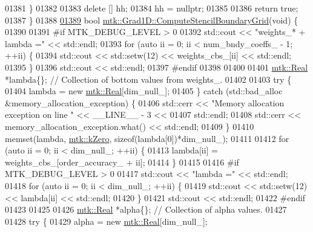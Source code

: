 \begin{DoxyCode}
{{01381   \}
01382 
01383   \textcolor{keyword}{delete} [] hh;
01384   hh = \textcolor{keyword}{nullptr};
01385 
01386   \textcolor{keywordflow}{return} \textcolor{keyword}{true};
01387 \}
01388 
\hypertarget{mtk__grad__1d_8cc_source_l01389}{}\hyperlink{classmtk_1_1Grad1D_a7ad1cecf6b52647263208ffaea0ee1e5}{01389} \textcolor{keywordtype}{bool} \hyperlink{classmtk_1_1Grad1D_a7ad1cecf6b52647263208ffaea0ee1e5}{mtk::Grad1D::ComputeStencilBoundaryGrid}(\textcolor{keywordtype}{void}) \{
01390 
01391 \textcolor{preprocessor}{  #if MTK\_DEBUG\_LEVEL > 0}
01392   std::cout << \textcolor{stringliteral}{"weights\_* + lambda ="} << std::endl;
01393   \textcolor{keywordflow}{for} (\textcolor{keyword}{auto} ii = 0; ii < num\_bndy\_coeffs\_ - 1; ++ii) \{
01394     std::cout << std::setw(12) << weights\_cbs\_[ii] << std::endl;
01395   \}
01396   std::cout << std::endl;
01397 \textcolor{preprocessor}{  #endif}
01398 
01400 
01401   \hyperlink{group__c01-roots_gac080bbbf5cbb5502c9f00405f894857d}{mtk::Real} *lambda\{\}; \textcolor{comment}{// Collection of bottom values from weights\_.}
01402 
01403   \textcolor{keywordflow}{try} \{
01404     lambda = \textcolor{keyword}{new} \hyperlink{group__c01-roots_gac080bbbf5cbb5502c9f00405f894857d}{mtk::Real}[dim\_null\_];
01405   \} \textcolor{keywordflow}{catch} (std::bad\_alloc &memory\_allocation\_exception) \{
01406     std::cerr << \textcolor{stringliteral}{"Memory allocation exception on line "} << \_\_LINE\_\_ - 3 <<
01407       std::endl;
01408     std::cerr << memory\_allocation\_exception.what() << std::endl;
01409   \}
01410   memset(lambda, \hyperlink{group__c01-roots_ga59a451a5fae30d59649bcda274fea271}{mtk::kZero}, \textcolor{keyword}{sizeof}(lambda[0])*dim\_null\_);
01411 
01412   \textcolor{keywordflow}{for} (\textcolor{keyword}{auto} ii = 0; ii < dim\_null\_; ++ii) \{
01413     lambda[ii] = weights\_cbs\_[order\_accuracy\_ + ii];
01414   \}
01415 
01416 \textcolor{preprocessor}{  #if MTK\_DEBUG\_LEVEL > 0}
01417   std::cout << \textcolor{stringliteral}{"lambda ="} << std::endl;
01418   \textcolor{keywordflow}{for} (\textcolor{keyword}{auto} ii = 0; ii < dim\_null\_; ++ii) \{
01419     std::cout << std::setw(12) << lambda[ii] << std::endl;
01420   \}
01421   std::cout << std::endl;
01422 \textcolor{preprocessor}{  #endif}
01423 
01425 
01426   \hyperlink{group__c01-roots_gac080bbbf5cbb5502c9f00405f894857d}{mtk::Real} *alpha\{\}; \textcolor{comment}{// Collection of alpha values.}
01427 
01428   \textcolor{keywordflow}{try} \{
01429     alpha = \textcolor{keyword}{new} \hyperlink{group__c01-roots_gac080bbbf5cbb5502c9f00405f894857d}{mtk::Real}[dim\_null\_];
}}
\end{DoxyCode}
